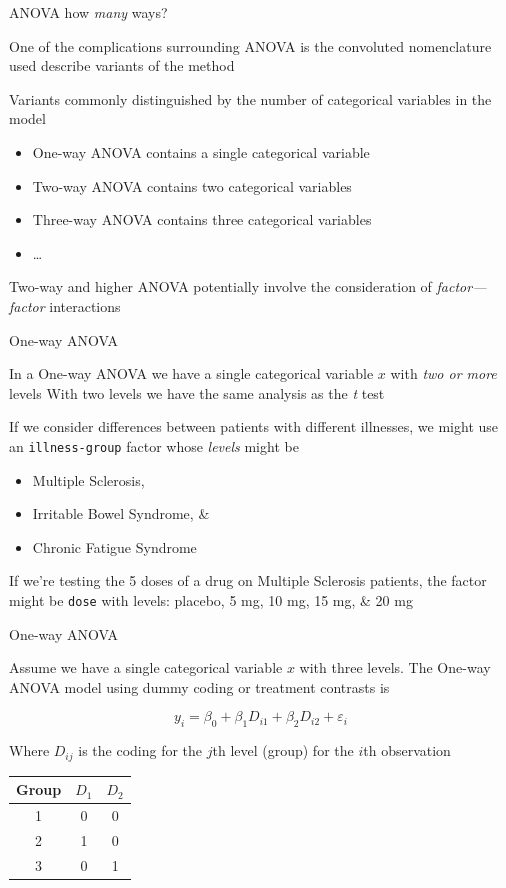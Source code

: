 \documentclass[10pt,ignorenonframetext,compress, aspectratio=169]{beamer}
\providecommand{\tightlist}{%
  \setlength{\itemsep}{0pt}\setlength{\parskip}{0pt}}
\begin{document}
\begin{frame}{ANOVA how \emph{many} ways?}

One of the complications surrounding ANOVA is the convoluted
nomenclature used describe variants of the method

Variants commonly distinguished by the number of categorical variables
in the model

\begin{itemize}
\tightlist
\item
  \alert{One-way ANOVA} contains a single categorical variable
\item
  \alert{Two-way ANOVA} contains two categorical variables
\item
  \alert{Three-way ANOVA} contains three categorical variables
\item
  \ldots{}
\end{itemize}

Two-way and higher ANOVA potentially involve the consideration of
\emph{factor---factor} interactions

\end{frame}

\begin{frame}[fragile]{One-way ANOVA}

In a \alert{One-way ANOVA} we have a single categorical variable \(x\)
with \emph{two or more} levels With two levels we have the same analysis
as the \emph{t} test

If we consider differences between patients with different illnesses, we
might use an \texttt{illness-group} factor whose \emph{levels} might be

\begin{itemize}
\tightlist
\item
  Multiple Sclerosis,
\item
  Irritable Bowel Syndrome, \&
\item
  Chronic Fatigue Syndrome
\end{itemize}

If we're testing the 5 doses of a drug on Multiple Sclerosis patients,
the factor might be \texttt{dose} with levels: placebo, 5 mg, 10 mg, 15
mg, \& 20 mg

\end{frame}

\begin{frame}{One-way ANOVA}

Assume we have a single categorical variable \(x\) with three levels.
The One-way ANOVA model using dummy coding or treatment contrasts is

\[y_i = \beta_0 + \beta_1D_{i1} + \beta_2D_{i2} + \varepsilon_i\]

Where \(D_{ij}\) is the coding for the \(j\)th level (group) for the
\(i\)th observation

\begin{longtable}[]{@{}ccc@{}}
\toprule
Group & \(D_1\) & \(D_2\)\tabularnewline
\midrule
\endhead
1 & 0 & 0\tabularnewline
2 & 1 & 0\tabularnewline
3 & 0 & 1\tabularnewline
\bottomrule
\end{longtable}

\end{frame}
\end{document}
